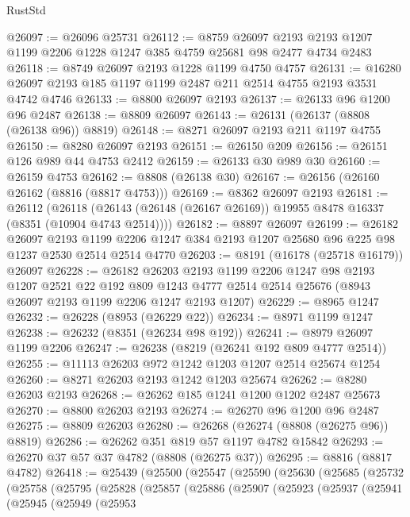 \begin{lexlean}{RustStd}
\begin{coremodule}
@26097 := @26096 @25731
@26112 := @8759
    @26097
    @2193
    @2193
    @1207
    @1199
    @2206
    @1228
    @1247
    @385
    @4759
    @25681
    @98
    @2477
    @4734
    @2483
@26118 := @8749 @26097 @2193 @1228 @1199 @4750 @4757
@26131 := @16280 @26097 @2193 @185 @1197 @1199 @2487 @211 @2514 @4755 @2193 @3531 @4742 @4746
@26133 := @8800 @26097 @2193
@26137 := @26133 @96 @1200 @96 @2487
@26138 := @8809 @26097
@26143 := @26131 (@26137 (@8808 (@26138 @96)) @8819)
@26148 := @8271 @26097 @2193 @211 @1197 @4755
@26150 := @8280 @26097 @2193
@26151 := @26150 @209
@26156 := @26151 @126 @989 @44 @4753 @2412
@26159 := @26133 @30 @989 @30
@26160 := @26159 @4753
@26162 := @8808 (@26138 @30)
@26167 := @26156 (@26160 @26162 (@8816 (@8817 @4753)))
@26169 := @8362 @26097 @2193
@26181 := @26112
    (@26118 (@26143 (@26148 (@26167 @26169)) @19955 @8478 @16337 (@8351 (@10904 @4743 @2514))))
@26182 := @8897 @26097
@26199 := @26182
    @26097
    @2193
    @1199
    @2206
    @1247
    @384
    @2193
    @1207
    @25680
    @96
    @225
    @98
    @1237
    @2530
    @2514
    @2514
    @4770
@26203 := @8191 (@16178 (@25718 @16179)) @26097
@26228 := @26182
    @26203
    @2193
    @1199
    @2206
    @1247
    @98
    @2193
    @1207
    @2521
    @22
    @192
    @809
    @1243
    @4777
    @2514
    @2514
    @25676
    (@8943 @26097 @2193 @1199 @2206 @1247 @2193 @1207)
@26229 := @8965 @1247
@26232 := @26228 (@8953 (@26229 @22))
@26234 := @8971 @1199 @1247
@26238 := @26232 (@8351 (@26234 @98 @192))
@26241 := @8979 @26097 @1199 @2206
@26247 := @26238 (@8219 (@26241 @192 @809 @4777 @2514))
@26255 := @11113 @26203 @972 @1242 @1203 @1207 @2514 @25674 @1254
@26260 := @8271 @26203 @2193 @1242 @1203 @25674
@26262 := @8280 @26203 @2193
@26268 := @26262 @185 @1241 @1200 @1202 @2487 @25673
@26270 := @8800 @26203 @2193
@26274 := @26270 @96 @1200 @96 @2487
@26275 := @8809 @26203
@26280 := @26268 (@26274 (@8808 (@26275 @96)) @8819)
@26286 := @26262 @351 @819 @57 @1197 @4782 @15842
@26293 := @26270 @37 @57 @37 @4782 (@8808 (@26275 @37))
@26295 := @8816 (@8817 @4782)
@26418 := @25439
    (@25500
      (@25547
        (@25590
          (@25630
            (@25685
              (@25732
                (@25758
                  (@25795
                    (@25828
                      (@25857
                        (@25886
                          (@25907
                            (@25923
                              (@25937
                                (@25941
                                  (@25945
                                    (@25949
                                      (@25953

\end{coremodule}
\end{lexlean}
